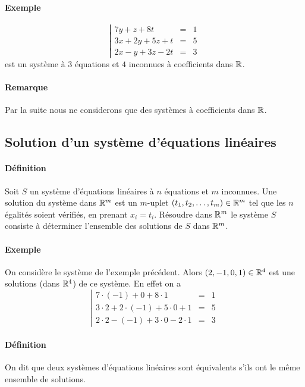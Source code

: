 \paragraph{Exemple}
$$\left\vert \begin{array}{rcl}
  7 y + z + 8 t & = & 1 \\
  3 x + 2 y + 5 z + t & = & 5 \\
  2 x - y + 3 z - 2 t & = & 3
\end{array} \right.$$
est un système à $3$ équations et $4$ inconnues à coefficients dans $\mathbb{R}$.

\paragraph{Remarque} Par la suite nous ne considerons que des systèmes à coefficients dans $\mathbb{R}$.

%
\subsection{Solution d'un système d'équations linéaires}
%
\paragraph{Définition} Soit $S$ un système d'équations linéaires à $n$ équations et $m$ inconnues. Une solution du système dans $\mathbb{R}^m$ est un $m$-uplet $(t_1, t_2, \ldots, t_m) \in \mathbb{R}^m$ tel que les $n$ égalités soient vérifiés, en prenant $x_i = t_i$. Résoudre dans $\mathbb{R}^m$ le système $S$ consiste à déterminer l'ensemble des solutions de $S$ dans $\mathbb{R}^m$.

\paragraph{Exemple} On considère le système de l'exemple précédent. Alors $(2, -1, 0, 1) \in \mathbb{R}^4$ est une solutions (dans $\mathbb{R}^4$) de ce système. En effet on a
$$\left\vert \begin{array}{rcl}
  7 \cdot (-1) + 0 + 8 \cdot 1 & = & 1 \\
  3 \cdot 2 + 2 \cdot (-1) + 5 \cdot 0 + 1 & = & 5 \\
  2 \cdot 2 - (-1) + 3 \cdot 0 - 2 \cdot 1 & = & 3
\end{array} \right.$$

\paragraph{Définition} On dit que deux systèmes d'équations linéaires sont équivalents s'ils ont le même ensemble de solutions.


